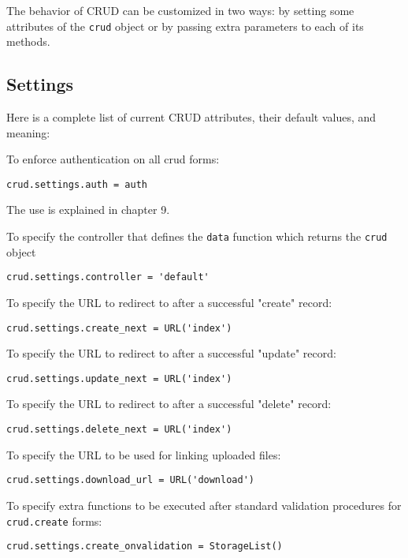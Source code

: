 \documentclass[justified,sixbynine,notoc]{tufte-book}
\def\ft{\small\tt}
\begin{document}
\begin{fullwidth}
The behavior of CRUD can be customized in two ways: by setting some attributes of the {\ft crud} object or by passing extra parameters to each of its methods.

\goodbreak\subsection{Settings}

Here is a complete list of current CRUD attributes, their default values, and meaning:

To enforce authentication on all crud forms:

\begin{lstlisting}
crud.settings.auth = auth
\end{lstlisting}
The use is explained in chapter 9.

To specify the controller that defines the {\ft data} function which returns the {\ft crud} object

\begin{lstlisting}
crud.settings.controller = 'default'
\end{lstlisting}

To specify the URL to redirect to after a successful "create" record:

\begin{lstlisting}
crud.settings.create_next = URL('index')
\end{lstlisting}

To specify the URL to redirect to after a successful "update" record:

\begin{lstlisting}
crud.settings.update_next = URL('index')
\end{lstlisting}

To specify the URL to redirect to after a successful "delete" record:

\begin{lstlisting}
crud.settings.delete_next = URL('index')
\end{lstlisting}

To specify the URL to be used for linking uploaded files:

\begin{lstlisting}
crud.settings.download_url = URL('download')
\end{lstlisting}

To specify extra functions to be executed after standard validation procedures for {\ft crud.create} forms:

\begin{lstlisting}
crud.settings.create_onvalidation = StorageList()
\end{lstlisting}


\end{fullwidth}
\end{document}
